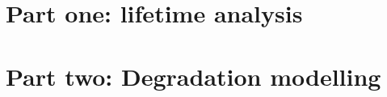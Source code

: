 \documentclass[harvard,colorlinks,emptypage]{curtinThesis}
\begin{document}
\createtitlepage %

\plagiarismstatement %

\showthesisquote %










\part{Part one: lifetime analysis}



\part{Part two: Degradation modelling}




\begin{customappendix}{} %


\end{customappendix}


\backmatter

\ackstatement %
\end{document}
